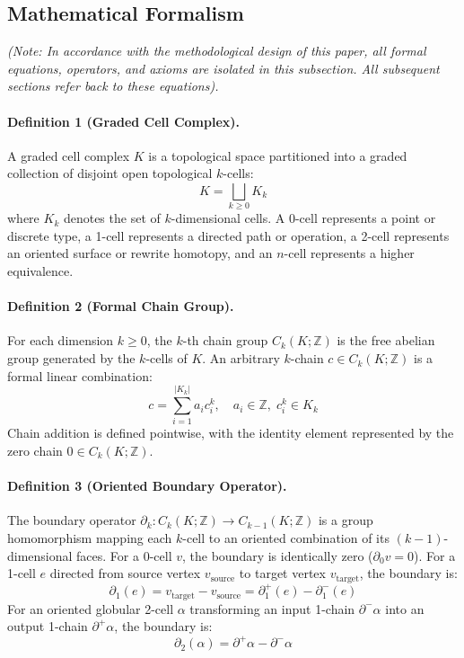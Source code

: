 \documentclass[10pt,a4paper]{article}
\begin{document}
\subsection{Mathematical Formalism}
\textit{(Note: In accordance with the methodological design of this paper, all formal equations, operators, and axioms are isolated in this subsection. All subsequent sections refer back to these equations).}

\paragraph{Definition 1 (Graded Cell Complex).}
A graded cell complex $K$ is a topological space partitioned into a graded collection of disjoint open topological $k$-cells:
\begin{equation}
K = \bigsqcup_{k \ge 0} K_k
\label{eq:complex}
\end{equation}
where $K_k$ denotes the set of $k$-dimensional cells. A 0-cell represents a point or discrete type, a 1-cell represents a directed path or operation, a 2-cell represents an oriented surface or rewrite homotopy, and an $n$-cell represents a higher equivalence.

\paragraph{Definition 2 (Formal Chain Group).}
For each dimension $k \ge 0$, the $k$-th chain group $C_k(K; \mathbb{Z})$ is the free abelian group generated by the $k$-cells of $K$. An arbitrary $k$-chain $c \in C_k(K; \mathbb{Z})$ is a formal linear combination:
\begin{equation}
c = \sum_{i=1}^{|K_k|} a_i c_i^k, \quad a_i \in \mathbb{Z}, \; c_i^k \in K_k
\label{eq:chain}
\end{equation}
Chain addition is defined pointwise, with the identity element represented by the zero chain $0 \in C_k(K; \mathbb{Z})$.

\paragraph{Definition 3 (Oriented Boundary Operator).}
The boundary operator $\partial_k : C_k(K; \mathbb{Z}) \to C_{k-1}(K; \mathbb{Z})$ is a group homomorphism mapping each $k$-cell to an oriented combination of its $(k-1)$-dimensional faces. For a 0-cell $v$, the boundary is identically zero ($\partial_0 v = 0$). For a 1-cell $e$ directed from source vertex $v_{\text{source}}$ to target vertex $v_{\text{target}}$, the boundary is:
\begin{equation}
\partial_1(e) = v_{\text{target}} - v_{\text{source}} = \partial_1^+(e) - \partial_1^-(e)
\label{eq:b1}
\end{equation}
For an oriented globular 2-cell $\alpha$ transforming an input 1-chain $\partial^- \alpha$ into an output 1-chain $\partial^+ \alpha$, the boundary is:
\begin{equation}
\partial_2(\alpha) = \partial^+ \alpha - \partial^- \alpha
\label{eq:b2}
\end{equation}
\end{document}
